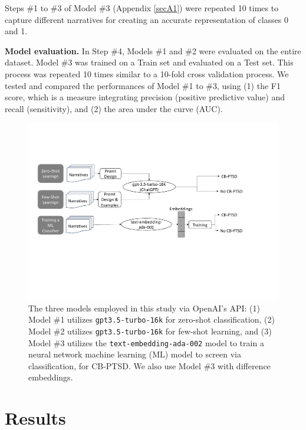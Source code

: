 \documentclass[bst/sn-nature]{sn-jnl}%
\theoremstyle{thmstyleone}%
\theoremstyle{thmstyletwo}%
\theoremstyle{thmstylethree}%
\begin{document}
Steps \#1 to \#3 of Model \#3 (Appendix \ref{secA1}) were repeated 10 times to capture different narratives for creating an accurate representation of classes 0 and 1.


\textbf{Model evaluation.}
In Step \#4, Models \#1 and \#2 were evaluated on the entire dataset.
Model \#3 was trained on a Train set and evaluated on a Test set.
This process was repeated 10 times similar to a 10-fold cross validation process.
We tested and compared the performances of Model \#1 to \#3, using (1) the F1 score, which is a measure integrating precision (positive predictive value) and recall (sensitivity), and (2) the area under the curve (AUC).

\begin{figure}
    \centering
    \includegraphics[scale=0.5, trim={1cm 7cm 4cm 5cm}, clip]{images/Fig_models_architecture.pdf}
    \caption{The three models employed in this study via OpenAI's API: (1) Model \#1 utilizes \texttt{gpt3.5-turbo-16k} for zero-shot classification, 
    (2) Model \#2 utilizes \texttt{gpt3.5-turbo-16k} for few-shot learning, and
    (3) Model \#3 utilizes the \texttt{text-embedding-ada-002} model to train a neural network machine learning (ML) model to screen via classification, for CB-PTSD.
    We also use Model \#3 with difference embeddings.}
    \label{fig:models}
\end{figure}

\section{Results}
\end{document}
